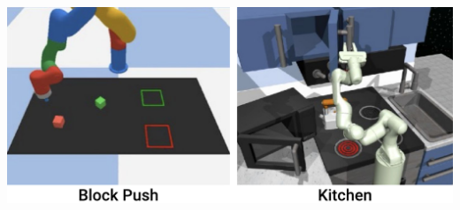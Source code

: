 \documentclass[Afour,sageh,times]{sagej}
\begin{document}
\begin{table}[t]
\centering
\includegraphics[width=0.9\linewidth]{figure/multitask_thumbnails.pdf}

\vspace{2mm}


\end{table}
\end{document}
